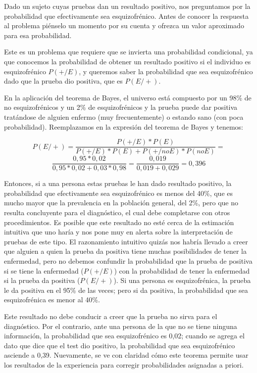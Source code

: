 \documentclass[]{book}
\begin{document}
Dado un sujeto cuyas pruebas dan un resultado positivo, nos preguntamos por la probabilidad que efectivamente sea esquizofrénico. Antes de conocer la respuesta al problema piénselo un momento por su cuenta y ofrezca un valor aproximado para esa probabilidad.

Este es un problema que requiere que se invierta una probabilidad
condicional, ya que conocemos la probabilidad de obtener un resultado
positivo si el individuo es esquizofrénico \(P(+/E)\), y queremos saber la probabilidad que sea esquizofrénico dado que la prueba dio positiva, que es \(P(E/+)\).

En la aplicación del teorema de Bayes, el universo está compuesto por un 98\% de no esquizofrénicos y un 2\% de esquizofrénicos y la prueba puede dar positiva tratándose de alguien enfermo (muy frecuentemente) o estando sano (con poca probabilidad). Reemplazamos en la expresión del teorema de Bayes y tenemos:

\[P(E/+) = \frac{P(+/E)*P(E)}{P(+/E)*P(E) + P(+/noE)*P(noE)} =\] \[\frac{0,95*0,02}{0,95*0,02 + 0,03*0,98} = \frac{0,019}{0,019 + 0,029} = 0,396\]

Entonces, si a una persona estas pruebas le han dado resultado positivo, la probabilidad que efectivamente sea esquizofrénico es menos del 40\%, que es mucho mayor que la prevalencia en la población general, del 2\%, pero que no resulta concluyente para el diagnóstico, el cual debe completarse con otros procedimientos. Es posible que este resultado no esté cerca de la estimación intuitiva que uno haría y nos pone muy en alerta sobre la interpretación de pruebas de este tipo. El razonamiento intuitivo quizás nos habría llevado a creer que alguien a quien la prueba da positiva tiene muchas posibilidades de tener la enfermedad, pero no debemos confundir la probabilidad que la prueba de positiva si se tiene la enfermedad (\(P(+/E)\)) con la probabilidad de tener la enfermedad si la prueba da positiva (\(P(E/+)\)). Si una persona es esquizofrénica, la prueba le da positiva en el 95\% de las veces; pero si da positiva, la probabilidad que sea esquizofrénica es menor al 40\%.

Este resultado no debe conducir a creer que la prueba no sirva para el
diagnóstico. Por el contrario, ante una persona de la que no se tiene
ninguna información, la probabilidad que sea esquizofrénico es 0,02;
cuando se agrega el dato que dice que el test dio positivo, la
probabilidad que sea esquizofrénico asciende a 0,39. Nuevamente, se ve
con claridad cómo este teorema permite usar los resultados de la
experiencia para corregir probabilidades asignadas a priori.
\end{document}
